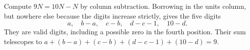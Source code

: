 Compute $9N=10N-N$ by column subtraction. Borrowing in the units column, but nowhere else because the digits increase strictly, gives the five digits
\[a,\quad b-a,\quad c-b,\quad d-c-1,\quad10-d.\]
They are valid digits, including a possible zero in the fourth position. Their sum telescopes to $a+(b-a)+(c-b)+(d-c-1)+(10-d)=\boxed9$.
